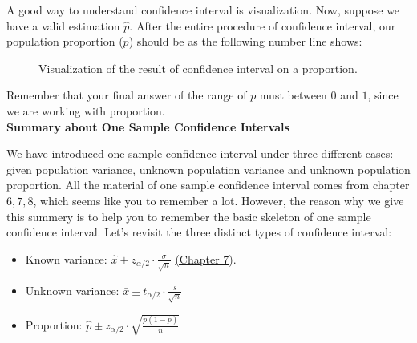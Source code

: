 \noindent
A good way to understand confidence interval is visualization. Now, suppose we have a valid estimation $\hat{p}$. After the entire procedure of confidence interval, our population proportion ($p$) should be as the following number line shows:\\

\begin{figure}
\begin{center}
\caption{Visualization of the result of confidence interval on a proportion.}
\end{center}
\end{figure}

\noindent
Remember that your final answer of the range of $p$ must between $0$ and $1$, since we are working with proportion.\\

\noindent
\textbf{Summary about One Sample Confidence Intervals}

\noindent
We have introduced one sample confidence interval under three different cases: given population variance, unknown population variance and unknown population proportion. All the material of one sample confidence interval comes from chapter $6, 7, 8$, which seems like you to remember a lot. However, the reason why we give this summery is to help you to remember the basic skeleton of one sample confidence interval. Let's revisit the three distinct types of confidence interval:

\begin{itemize}
    \item Known variance: \(\hat{x} \pm z_{\alpha/2} \cdot \frac{\sigma}{\sqrt{n}}\) \hyperref[ch:7]{(Chapter 7)}.
    
    \item Unknown variance: $\bar{x} \pm t_{\scriptscriptstyle{\alpha/2}} \cdot \frac{s}{\sqrt{n}}$
    
    \item Proportion: $\hat{p} \pm z_{\scriptscriptstyle{\alpha/2}} \cdot \sqrt{\frac{\hat{p}(1-\hat{p})}{n}}$
\end{itemize}


